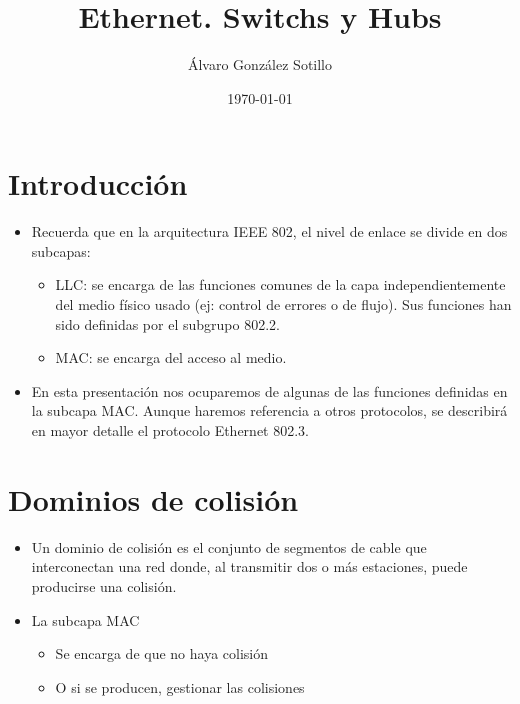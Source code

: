 \documentclass{article}
\author{Álvaro González Sotillo}
\date{\today}
\title{Ethernet. Switchs y Hubs}
\begin{document}
\maketitle
\setcounter{tocdepth}{1}
\tableofcontents



\section{Introducción}
\label{sec:orgf6d5184}

\begin{itemize}
\item Recuerda que en la arquitectura IEEE 802, el nivel de enlace se divide en dos subcapas:
\begin{itemize}
\item LLC: se encarga de las funciones comunes de la capa independientemente del medio físico usado (ej: control de errores o de flujo). Sus funciones han sido definidas por el subgrupo 802.2.
\item MAC: se encarga del acceso al medio.
\end{itemize}

\item En esta presentación nos ocuparemos de algunas de las funciones definidas en la subcapa MAC. Aunque haremos referencia a otros protocolos, se describirá en mayor detalle el protocolo Ethernet 802.3.
\end{itemize}


\section{Dominios de colisión}
\label{sec:org33fd24c}
\begin{itemize}
\item Un dominio de colisión es el conjunto de segmentos de cable que interconectan una red donde, al transmitir dos o más estaciones, puede producirse una colisión.
\item La subcapa MAC
\begin{itemize}
\item Se encarga de que no haya colisión
\item O si se producen, gestionar las colisiones
\end{itemize}
\end{itemize}
\end{document}
